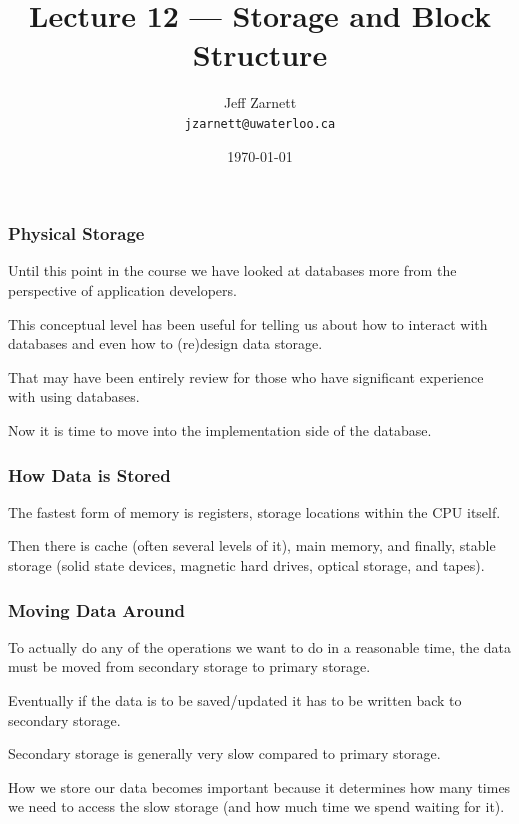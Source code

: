 

\title{Lecture 12 --- Storage and Block Structure }

\author{Jeff Zarnett \\ \small \texttt{jzarnett@uwaterloo.ca}}
\date{\today}




\begin{frame}
  \titlepage

 \end{frame}



\begin{frame}
\frametitle{Physical Storage}

Until this point in the course we have looked at databases more from the perspective of application developers.

This conceptual level has been useful for telling us about how to interact with databases and even how to (re)design data storage. 

That may have been entirely review for those who have significant experience with using databases. 

Now it is time to move into the implementation side of the database. 

\end{frame}



\begin{frame}
\frametitle{How Data is Stored}

The fastest form of memory is registers, storage locations within the CPU itself. 

Then there is cache (often several levels of it), main memory, and finally, stable storage (solid state devices, magnetic hard drives, optical storage, and tapes). 

\end{frame}



\begin{frame}
\frametitle{Moving Data Around}

To actually do any of the operations we want to do in a reasonable time, the data must be moved from secondary storage to primary storage. 

Eventually if the data is to be saved/updated it has to be written back to secondary storage.

Secondary storage is generally very slow compared to primary storage. 

How we store our data becomes important because it determines how many times we need to access the slow storage (and how much time we spend waiting for it). 

\end{frame}



